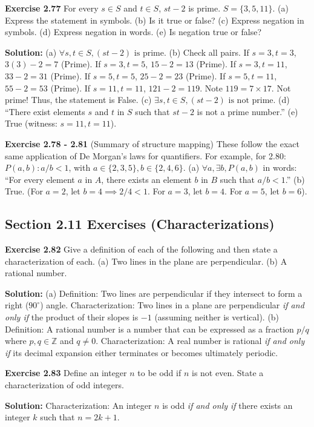 \documentclass[12pt]{article}
\begin{document}
\textbf{Exercise 2.77}
For every $s \in S$ and $t \in S$, $st - 2$ is prime. $S = \{3, 5, 11\}$.
(a) Express the statement in symbols.
(b) Is it true or false?
(c) Express negation in symbols.
(d) Express negation in words.
(e) Is negation true or false?
\begin{mdframed}
\textbf{Solution:}
(a) $\forall s, t \in S, (st - 2) \text{ is prime}$.
(b) Check all pairs. If $s=3, t=3$, $3(3)-2 = 7$ (Prime). If $s=3, t=5$, $15-2=13$ (Prime). If $s=3, t=11$, $33-2=31$ (Prime). If $s=5, t=5$, $25-2=23$ (Prime). If $s=5, t=11$, $55-2=53$ (Prime). If $s=11, t=11$, $121-2=119$. Note $119 = 7 \times 17$. Not prime!
Thus, the statement is False.
(c) $\exists s, t \in S, (st - 2) \text{ is not prime}$.
(d) ``There exist elements $s$ and $t$ in $S$ such that $st - 2$ is not a prime number.''
(e) True (witness: $s=11, t=11$).
\end{mdframed}

\textbf{Exercise 2.78 - 2.81} (Summary of structure mapping)
These follow the exact same application of De Morgan's laws for quantifiers.
For example, for 2.80: $P(a,b): a/b < 1$, with $a \in \{2,3,5\}, b \in \{2,4,6\}$.
(a) $\forall a, \exists b, P(a,b)$ in words: ``For every element $a$ in $A$, there exists an element $b$ in $B$ such that $a/b < 1$.''
(b) True. (For $a=2$, let $b=4 \implies 2/4 < 1$. For $a=3$, let $b=4$. For $a=5$, let $b=6$).

\subsection{Section 2.11 Exercises (Characterizations)}

\textbf{Exercise 2.82}
Give a definition of each of the following and then state a characterization of each.
(a) Two lines in the plane are perpendicular.
(b) A rational number.
\begin{mdframed}
\textbf{Solution:}
(a) Definition: Two lines are perpendicular if they intersect to form a right ($90^\circ$) angle. 
Characterization: Two lines in a plane are perpendicular \textit{if and only if} the product of their slopes is $-1$ (assuming neither is vertical).
(b) Definition: A rational number is a number that can be expressed as a fraction $p/q$ where $p, q \in \mathbb{Z}$ and $q \neq 0$.
Characterization: A real number is rational \textit{if and only if} its decimal expansion either terminates or becomes ultimately periodic.
\end{mdframed}

\textbf{Exercise 2.83}
Define an integer $n$ to be odd if $n$ is not even. State a characterization of odd integers.
\begin{mdframed}
\textbf{Solution:}
Characterization: An integer $n$ is odd \textit{if and only if} there exists an integer $k$ such that $n = 2k + 1$.
\end{mdframed}
\end{document}
